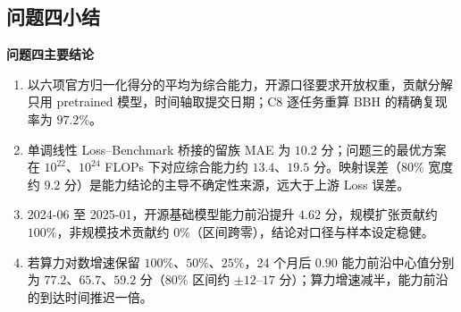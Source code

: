 \subsection{问题四小结}

\begin{conclusionbox}
\textbf{问题四主要结论}
\begin{enumerate}
\item 以六项官方归一化得分的平均为综合能力，开源口径要求开放权重，贡献分解只用 pretrained 模型，时间轴取提交日期；C8 逐任务重算 BBH 的精确复现率为 $97.2\%$。
\item 单调线性 Loss--Benchmark 桥接的留族 MAE 为 $10.2$ 分；问题三的最优方案在 $10^{22}$、$10^{24}$ FLOPs 下对应综合能力约 $13.4$、$19.5$ 分。映射误差（80\% 宽度约 $9.2$ 分）是能力结论的主导不确定性来源，远大于上游 Loss 误差。
\item 2024-06 至 2025-01，开源基础模型能力前沿提升 $4.62$ 分，规模扩张贡献约 $100\%$，非规模技术贡献约 $0\%$（区间跨零），结论对口径与样本设定稳健。
\item 若算力对数增速保留 $100\%$、$50\%$、$25\%$，24 个月后 $0.90$ 能力前沿中心值分别为 $77.2$、$65.7$、$59.2$ 分（80\% 区间约 $\pm12$--$17$ 分）；算力增速减半，能力前沿的到达时间推迟一倍。
\end{enumerate}
\end{conclusionbox}
